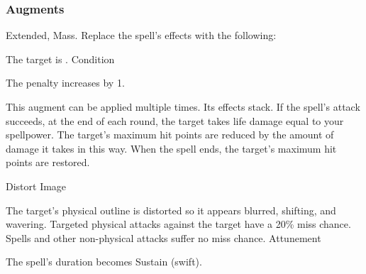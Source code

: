 \subsubsection{Augments}
 Extended, Mass.
Replace
the spell's effects with the following:
\begin{augmenteffects}
\spelleffect The target is \disoriented.
\spelldur Condition
\end{augmenteffects}
The penalty increases by 1.
\par
This augment can be applied multiple times.
Its effects stack.
If the spell's attack succeeds, at the end of each round, the target takes life damage equal to your spellpower.
The target's maximum hit points are reduced by the amount of damage it takes in this way.
When the spell ends, the target's maximum hit points are restored.
\begin{spellsection}{Distort Image}
\begin{spellcontent}
\begin{spelltargetinginfo}
\end{spelltargetinginfo}
\begin{spelleffects}
\spelleffect
The target's physical outline is distorted so it appears blurred, shifting, and wavering.
Targeted physical attacks against the target have a 20\% miss chance.
Spells and other non-physical attacks suffer no miss chance.
\spelldur Attunement
\end{spelleffects}
\end{spellcontent}
\begin{spellfooter}
\miscastexplode
\end{spellfooter}
\begin{spellcantrip}
The spell's duration becomes Sustain (swift).
\end{spellcantrip}
\end{spellsection}
